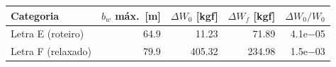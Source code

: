 \begin{tabular}{lrrrr}
\toprule
Categoria & $b_w$ máx.\ [m] & $\Delta W_0$ [kgf] & $\Delta W_f$ [kgf] & $\Delta W_0/W_0$ \\
\midrule
Letra E (roteiro) & 64.9 & 11.23 & 71.89 & 4.1e$-$05 \\
Letra F (relaxado) & 79.9 & 405.32 & 234.98 & 1.5e$-$03 \\
\bottomrule
\end{tabular}